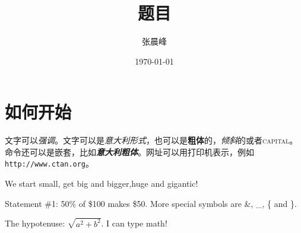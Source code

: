 \documentclass[UTF8,a4paper,12pt]{article}
\begin{document}
\title{题目}
\author{张晨峰}
\date{\today}
\maketitle

\section{如何开始}

文字可以\emph{强调}。文字可以是\textit{意大利形式}，也可以是\textbf{粗体}的，\textsl{倾斜}的或者\textsc{capital}。
命令还可以是嵌套，比如\textit{\textbf{意大利粗体}}。网址可以用打印机表示，例如\texttt{http://www.ctan.org}。

\noindent\tiny We \scriptsize start \footnotesize \small small,
\normalsize get \large big \Large and \LARGE bigger,\huge huge and \Huge gigantic!

\normalsize Statement \#1:
50\% of \$100 makes \$50.
More special symbols are \&, \_, \{ and \}.

The hypotenuse: $\sqrt{a^{2} + b^{2}}$. I can type math!
\end{document}
